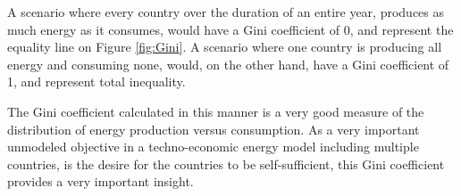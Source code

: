 A scenario where every country over the duration of an entire year, produces as much energy as it consumes, would have a Gini coefficient of 0, and represent the equality line on Figure \ref{fig:Gini}. A scenario where one country is producing all energy and consuming none, would, on the other hand, have a Gini coefficient of 1, and represent total inequality. 

The Gini coefficient calculated in this manner is a very good measure of the distribution of energy production versus consumption. As a very important unmodeled objective in a techno-economic energy model including multiple countries, is the desire for the countries to be self-sufficient, this Gini coefficient provides a very important insight.



